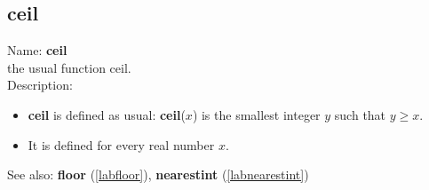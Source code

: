 \subsection{ceil}
\label{labceil}
\noindent Name: \textbf{ceil}\\
the usual function ceil.\\
\noindent Description: \begin{itemize}

\item \textbf{ceil} is defined as usual: \textbf{ceil}($x$) is the smallest integer $y$ such that $y \ge x$.

\item It is defined for every real number $x$.
\end{itemize}
See also: \textbf{floor} (\ref{labfloor}), \textbf{nearestint} (\ref{labnearestint})
